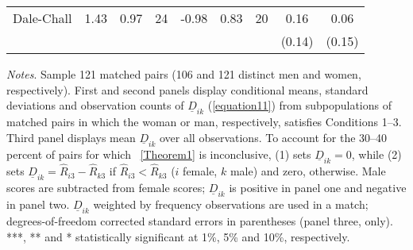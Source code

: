 \begin{table}[H]
\begin{threeparttable}
\begin{tabular}{p{3cm}S[table-format=3.3]@{}S[table-format=3.3]@{}S[table-format=3.2]@{}S[table-format=4.3]@{}S[table-format=3.3]@{}S[table-format=3.1]@{}S@{}S@{}}
            Dale-Chall                    &        1.43&        0.97&          24&       -0.98&        0.83&          20&        0.16   &        0.06   \\
                                          &            &            &            &            &            &            &      (0.14)   &      (0.15)   \\
            \bottomrule
        \end{tabular}
        \begin{tablenotes}
            \tiny
            \item \textit{Notes}. Sample 121 matched pairs (106 and 121 distinct men and women, respectively). First and second panels display conditional means, standard deviations and observation counts of \(\underline D_{ik}\) (\autoref{equation11}) from subpopulations of matched pairs in which the woman or man, respectively, satisfies Conditions 1--3. Third panel displays mean \(\underline D_{ik}\) over all observations. To account for the 30--40 percent of pairs for which ~\autoref{Theorem1} is inconclusive, (1) sets \(\underline D_{ik}=0\), while (2) sets \(\underline D_{ik}=\widehat R_{i3}-\widehat R_{k3}\) if \(\widehat R_{i3}<\widehat R_{k3}\) (\(i\) female, \(k\) male) and zero, otherwise. Male scores are subtracted from female scores; \(\underline D_{ik}\) is positive in panel one and negative in panel two. \(\underline D_{ik}\) weighted by frequency observations are used in a match; degrees-of-freedom corrected standard errors in parentheses (panel three, only). ***, ** and * statistically significant at 1\%, 5\% and 10\%, respectively.
        \end{tablenotes}
    \end{threeparttable}
\end{table}
